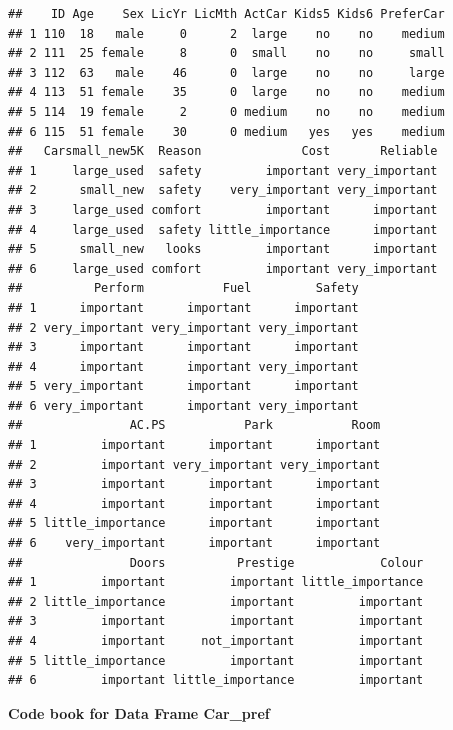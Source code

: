 \documentclass[
]{book}
\begin{document}
\begin{verbatim}
##    ID Age    Sex LicYr LicMth ActCar Kids5 Kids6 PreferCar
## 1 110  18   male     0      2  large    no    no    medium
## 2 111  25 female     8      0  small    no    no     small
## 3 112  63   male    46      0  large    no    no     large
## 4 113  51 female    35      0  large    no    no    medium
## 5 114  19 female     2      0 medium    no    no    medium
## 6 115  51 female    30      0 medium   yes   yes    medium
##   Carsmall_new5K  Reason              Cost       Reliable
## 1     large_used  safety         important very_important
## 2      small_new  safety    very_important very_important
## 3     large_used comfort         important      important
## 4     large_used  safety little_importance      important
## 5      small_new   looks         important      important
## 6     large_used comfort         important very_important
##          Perform           Fuel         Safety
## 1      important      important      important
## 2 very_important very_important very_important
## 3      important      important      important
## 4      important      important very_important
## 5 very_important      important      important
## 6 very_important      important very_important
##               AC.PS           Park           Room
## 1         important      important      important
## 2         important very_important very_important
## 3         important      important      important
## 4         important      important      important
## 5 little_importance      important      important
## 6    very_important      important      important
##               Doors          Prestige            Colour
## 1         important         important little_importance
## 2 little_importance         important         important
## 3         important         important         important
## 4         important     not_important         important
## 5 little_importance         important         important
## 6         important little_importance         important
\end{verbatim}

\textbf{Code book for Data Frame Car\_pref}
\end{document}

